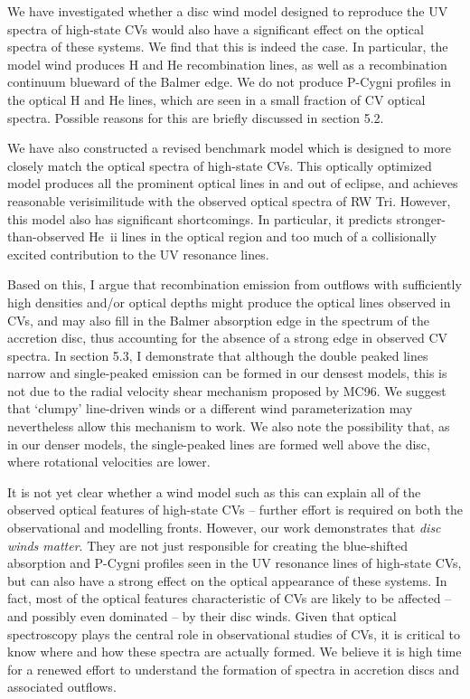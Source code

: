 We have investigated whether a disc wind model designed to reproduce
the UV spectra of high-state CVs would also have a significant effect
on the optical spectra of these systems. We find that this is indeed
the case. In particular, the model wind produces H and He
recombination lines, as well as a recombination continuum blueward of
the Balmer edge. We do not produce P-Cygni profiles
in the optical H and He lines, 
which are seen in a small fraction of CV optical spectra.
Possible reasons for this are briefly discussed in section 
5.2.

We have also constructed a revised benchmark model which is designed
to more closely match the optical spectra of high-state CVs. This
optically optimized model produces all the prominent optical lines in
and out of eclipse, and achieves reasonable verisimilitude with the
observed optical spectra of RW Tri. However, this model also has
significant shortcomings. In particular, it predicts
stronger-than-observed He~{\sc ii} lines in the optical region and too
much of a collisionally excited contribution to the UV resonance lines. 

Based on this, I argue that recombination emission 
from outflows with sufficiently high densities and/or optical depths 
might produce the optical lines observed in CVs, and may also 
fill in the Balmer absorption edge in the spectrum of the accretion disc, 
thus accounting for the absence of a strong edge in observed CV spectra.
In section 5.3, I demonstrate that
although the double peaked lines narrow and 
single-peaked emission can be formed in our densest models, 
this is not due to the radial velocity shear mechanism proposed by MC96.
We suggest that `clumpy' line-driven winds or a different
wind parameterization may nevertheless allow this mechanism to work.
We also note the possibility that, as in our denser models, 
the single-peaked lines are formed well above the disc, where 
rotational velocities are lower.

It is not yet clear whether a wind model such as this can
explain all of the observed optical features of high-state CVs --
further effort is required on both the observational
and modelling fronts.
However, our work demonstrates that {\sl disc winds matter}. They are
not just responsible for creating the blue-shifted absorption and
P-Cygni profiles seen in the UV resonance lines of high-state CVs, but
can also have a strong effect on the optical appearance of these
systems. In fact, most of the optical features characteristic of CVs
are likely to be affected -- and possibly even dominated -- by their disc
winds. Given that optical spectroscopy plays the central role in
observational studies of CVs, it is critical to know 
where and how these spectra are actually formed. We believe it is high
time for a renewed effort to understand the formation of spectra in
accretion discs and associated outflows. 


